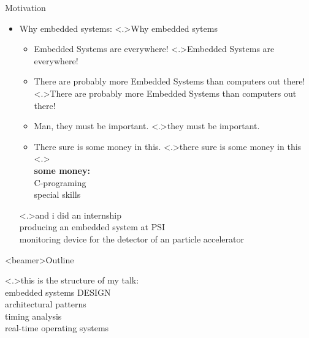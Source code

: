 \documentclass[ngerman={babel}, utf8, bigger, t, xcolor={table,dvipsnames}, ompress, hyperref={bookmarks,colorlinks},red]{beamer}
\begin{document}
\begin{frame}{Motivation}
	\begin{itemize}
		\item Why embedded systems:
		\note<.>{Why embedded sytems}
		\begin{itemize}
			\item Embedded Systems are everywhere!
			\note<.>{Embedded Systems are everywhere!}
			\item There are probably more Embedded Systems than computers out there!
			\note<.>{There are probably more Embedded Systems than computers out there!}
			\item Man, they must be important.
			\note<.>{they must be important.}
			\item There sure is some money in this.
			\note<.>{there sure is some money in this}
			\note<.>{\\ \textbf{some money:}\\ C-programing \\ special skills}
		\end{itemize}
		\note<.>{and i did an internship \\ producing an embedded system at PSI \\ monitoring device for the detector of an particle accelerator}
	\end{itemize}
\end{frame}

\begin{frame}<beamer>{Outline}
\addtocounter{framenumber}{-1}
\tableofcontents
\note<.>{this is the structure of my talk: \\ embedded systems DESIGN \\ architectural patterns \\ timing analysis \\ real-time operating systems}
\end{frame}
\end{document}
